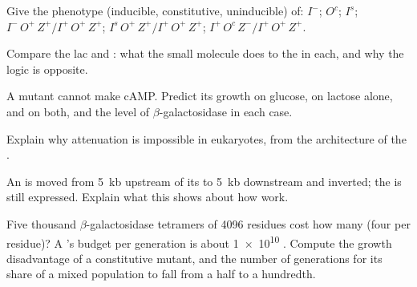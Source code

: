 \begin{exercise}[$\star\star$]\label{exo:b1:expression-control:5}
Give the phenotype (inducible, constitutive, uninducible) of: $I^-$;
$O^c$; $I^s$; $I^-\,O^+\,Z^+ / I^+\,O^+\,Z^+$; $I^s\,O^+\,Z^+ /
I^+\,O^+\,Z^+$; $I^+\,O^c\,Z^- / I^+\,O^+\,Z^+$.
\end{exercise}

\begin{exercise}[$\star\star$]\label{exo:b1:expression-control:6}
Compare the lac and : what the small molecule does to the
 in each, and why the logic is opposite.
\end{exercise}

\begin{exercise}[$\star\star$]\label{exo:b1:expression-control:7}
A mutant cannot make cAMP. Predict its growth on glucose, on lactose
alone, and on both, and the level of $\beta$-galactosidase in each
case.
\end{exercise}

\begin{exercise}[$\star\star$]\label{exo:b1:expression-control:8}
Explain why attenuation is impossible in eukaryotes, from the
architecture of the .
\end{exercise}

\begin{exercise}[$\star\star$]\label{exo:b1:expression-control:9}
An  is moved from \qty{5}{kb} upstream of its  to
\qty{5}{kb} downstream and inverted; the  is still expressed.
Explain what this shows about how  work.
\end{exercise}

\begin{exercise}[$\star\star\star$]\label{exo:b1:expression-control:10}
Five thousand $\beta$-galactosidase tetramers of \qty{4096}{}
residues cost how many  (four per residue)? A 's budget per
generation is about \qty{1e10}{} . Compute the growth
disadvantage of a constitutive mutant, and the number of generations
for its share of a mixed population to fall from a half to a
hundredth.
\end{exercise}

